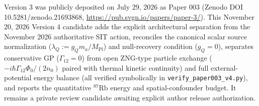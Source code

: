 \documentclass[
  american,
  11pt,
  letterpaper,
]{article}
\begin{document}
Version 3 was publicly deposited on July 29, 2026 as Paper 003 (Zenodo DOI 10.5281/zenodo.21693868, \url{https://pub.svgn.io/papers/paper-3/}). This November 20, 2026 Version 4 candidate adds the explicit architectural separation from the November 2026 authoritative SIT action, reconciles the canonical scalar source normalization (\(\lambda_Q := g_Q m_a / M_{\mathrm{Pl}}\)) and null-recovery condition (\(g_Q = 0\)), separates conservative GP (\(\Gamma_{12}=0\)) from open ZNG-type particle exchange (\(-i\hbar\Gamma_{12}\Phi_0/(2n_0)\) paired with thermal kinetic continuity) and full external-potential energy balance (all verified symbolically in \nolinkurl{verify_paper003_v4.py}), and reports the quantitative \(^{87}\mathrm{Rb}\) energy and spatial-confounder budget. It remains a private review candidate awaiting explicit author release authorization.
\end{document}
